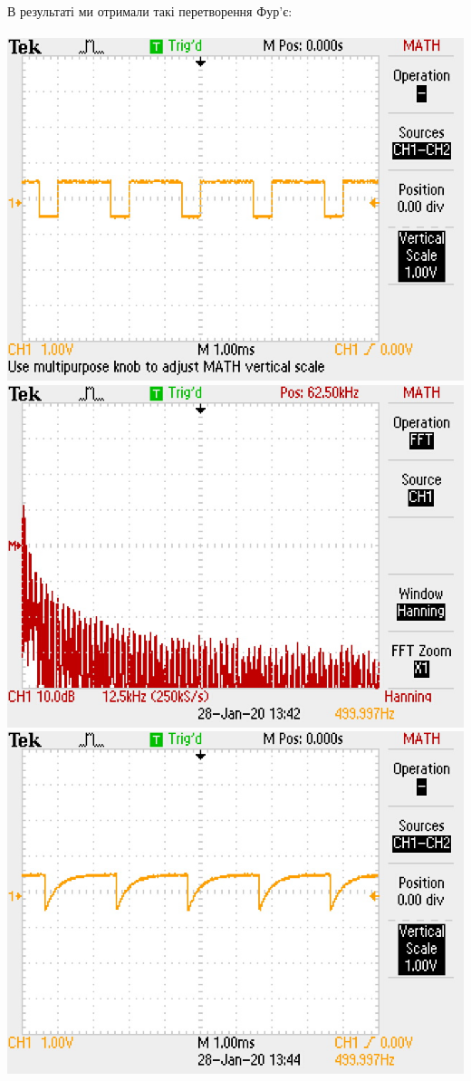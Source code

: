 В результаті ми отримали такі перетворення Фур'є: \\
\\
\includegraphics[width=\textwidth/2]{1-lab/res/1a.JPG}
\includegraphics[width=\textwidth/2]{1-lab/res/1b.JPG} \\
\includegraphics[width=\textwidth/2]{1-lab/res/2a.JPG}
